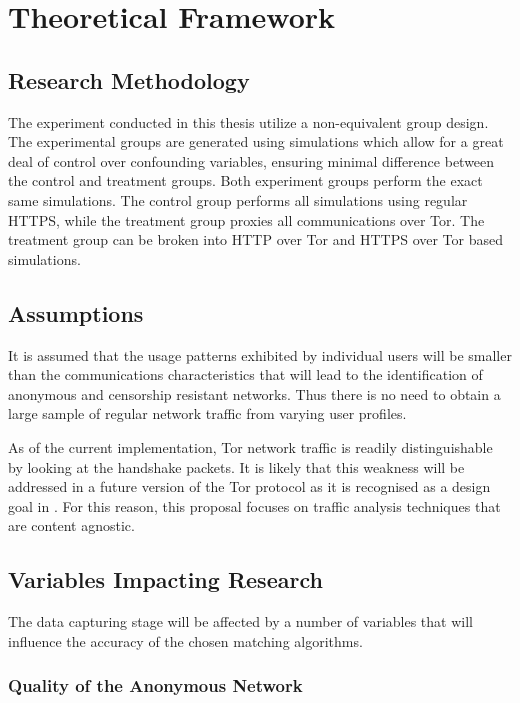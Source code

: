 \documentclass{ecuthesis}
\begin{document}
\chapter{Theoretical Framework}

\section{Research Methodology}

The experiment conducted in this thesis utilize a non-equivalent group design.
The experimental groups are generated using simulations which allow for a great
deal of control over confounding variables, ensuring minimal difference between
the control and treatment groups. Both experiment groups perform the exact same
simulations. The control group performs all simulations using regular HTTPS,
while the treatment group proxies all communications over Tor. The treatment
group can be broken into HTTP over Tor and HTTPS over Tor based simulations.

\section{Assumptions}

It is assumed that the usage patterns exhibited by individual users will be
smaller than the communications characteristics that will lead to the
identification of anonymous and censorship resistant networks. Thus there is no
need to obtain a large sample of regular network traffic from varying user
profiles.

As of the current implementation, Tor network traffic is readily
distinguishable by looking at the handshake packets. It is likely that this
weakness will be addressed in a future version of the Tor protocol as it is
recognised as a design goal in \textcite{Dingledine:2008p1542}. For this
reason, this proposal focuses on traffic analysis techniques that are content
agnostic.

\section{Variables Impacting Research}

The data capturing stage will be affected by a number of variables that will
influence the accuracy of the chosen matching algorithms.

\subsection{Quality of the Anonymous Network}
\end{document}
